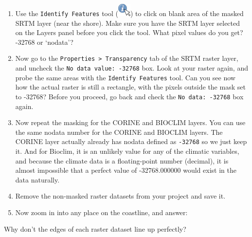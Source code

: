 \documentclass[
  letterpaper,
  DIV=11,
  numbers=noendperiod]{scrreprt}
\begin{document}
\begin{enumerate}
\def\labelenumi{(\arabic{enumi})}
\setcounter{enumi}{130}
\item
  Use the \texttt{Identify\ Features} tool
  (\includegraphics{index_files/mediabag/mActionIdentify.png}) to click
  on blank area of the masked SRTM layer (near the shore). Make sure you
  have the SRTM layer selected on the Layers panel before you click the
  tool. What pixel values do you get? -32768 or `nodata'?
\item
  Now go to the \texttt{Properties\ \textgreater{}\ Transparency} tab of
  the SRTM raster layer, and uncheck the
  \texttt{No\ data\ value:\ -32768} box. Look at your raster again, and
  probe the same areas with the \texttt{Identify\ Features} tool. Can
  you see now how the actual raster is still a rectangle, with the
  pixels outside the mask set to -32768? Before you proceed, go back and
  check the \texttt{No\ data:\ -32768} box again.
\item
  Now repeat the masking for the CORINE and BIOCLIM layers. You can use
  the same nodata number for the CORINE and BIOCLIM layers. The CORINE
  layer actually already has nodata defined as \texttt{-32768} so we
  just keep it. And for Bioclim, it is an unlikely value for any of the
  climatic variables, and because the climate data is a floating-point
  number (decimal), it is almost impossible that a perfect value of
  -32768.000000 would exist in the data naturally.
\item
  Remove the non-masked raster datasets from your project and save it.
\item
  Now zoom in into any place on the coastline, and answer:
\end{enumerate}

\begin{tcolorbox}[enhanced jigsaw, coltitle=black, toprule=.15mm, breakable, opacitybacktitle=0.6, left=2mm, colback=white, leftrule=.75mm, rightrule=.15mm, colbacktitle=quarto-callout-important-color!10!white, toptitle=1mm, titlerule=0mm, colframe=quarto-callout-important-color-frame, arc=.35mm, bottomtitle=1mm, opacityback=0, bottomrule=.15mm, title=\textcolor{quarto-callout-important-color}{\faExclamation}\hspace{0.5em}{Stop and Think}]

Why don't the edges of each raster dataset line up perfectly?

\end{tcolorbox}
\end{document}
